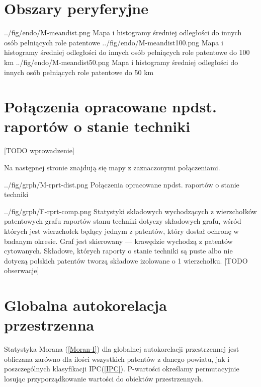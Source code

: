     \newpage\section
  {Obszary peryferyjne}

  \newpage\charttripled
{../fig/endo/M-meandist.png}
{ Mapa i histogramy średniej odległości do innych osób pełniących role patentowe }
{../fig/endo/M-meandist100.png}
{ Mapa i histogramy średniej odległości do innych osób pełniących role patentowe do 100 km }
{../fig/endo/M-meandist50.png}
{ Mapa i histogramy średniej odległości do innych osób pełniących role patentowe do 50 km }





    \newpage\section
  {Połączenia opracowane npdst. raportów o stanie techniki}

[TODO wprowadzenie]

Na następnej stronie znajdują się mapy z zaznaczonymi połączeniami.

\newpage

  \chart
{../fig/grph/M-rprt-dist.png}
{ Połączenia opracowane npdst. raportów o stanie techniki }\newpage

  \chartside
{../fig/grph/F-rprt-comp.png}
{ Statystyki składowych wychodzących z wierzchołków patentowych
  grafu raportów stanu techniki }{
 dotyczy składowych grafu, wśród których
jest wierzchołek będący jednym z patentów, który dostał ochronę w badanym okresie.
Graf jest skierowany --- krawędzie wychodzą z patentów cytowanych.
Składowe, których raporty o stanie techniki są puste albo nie dotyczą 
polskich patentów tworzą składowe izolowane o 1 wierzchołku.
[TODO obserwacje]
}



    \newpage\section
  {Globalna autokorelacja przestrzenna}

Statystyka Morana (\cref{Moran-I}) dla globalnej autokorelacji przestrzennej
jest obliczana zarówno dla ilości wszystkich patentów z danego powiatu, 
jak i poszczególnych klasyfikacji \ac{IPC}(\cref{IPC}).
P-wartości określamy permutacyjnie losując przyporządkowanie wartości
do obiektów przestrzennych\cite{pysal-07}.

